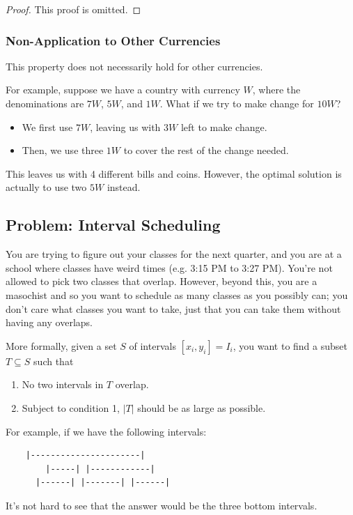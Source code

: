 \documentclass[letterpaper]{article}
\begin{document}
\begin{mdframed}[]
    \begin{proof}
        This proof is omitted. 
    \end{proof}
\end{mdframed}

\subsubsection{Non-Application to Other Currencies}
This property does not necessarily hold for other currencies. 

\bigskip 

For example, suppose we have a country with currency $W$, where the denominations are $7W$, $5W$, and $1W$. What if we try to make change for $10W$?
\begin{itemize}
    \item We first use $7W$, leaving us with $3W$ left to make change. 
    \item Then, we use three $1W$ to cover the rest of the change needed. 
\end{itemize}
This leaves us with 4 different bills and coins. However, the optimal solution is actually to use two $5W$ instead. 


\subsection{Problem: Interval Scheduling}
You are trying to figure out your classes for the next quarter, and you are at a school where classes have weird times (e.g. 3:15 PM to 3:27 PM). You're not allowed to pick two classes that overlap. However, beyond this, you are a masochist and so you want to schedule as many classes as you possibly can; you don't care what classes you want to take, just that you can take them without having any overlaps.

\bigskip 

More formally, given a set $S$ of intervals $[x_i, y_i] = I_i$, you want to find a subset $T \subseteq S$ such that
\begin{enumerate}
    \item No two intervals in $T$ overlap. 
    \item Subject to condition 1, $|T|$ should be as large as possible. 
\end{enumerate}
For example, if we have the following intervals:
\begin{verbatim}
    |----------------------|
        |-----| |------------|
      |------| |-------| |------|
\end{verbatim}
It's not hard to see that the answer would be the three bottom intervals. 
\end{document}
